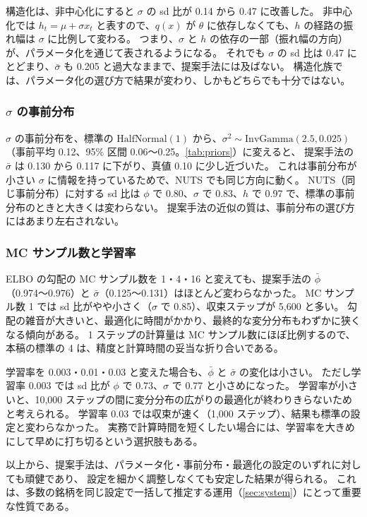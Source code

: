 構造化は、非中心化にすると $\sigma$ の sd 比が 0.14 から 0.47 に改善した。
非中心化では $h_t = \mu + \sigma x_t$ と表すので、$q(x)$ が $\theta$ に依存しなくても、$h$ の経路の振れ幅は $\sigma$ に比例して変わる。
つまり、$\sigma$ と $h$ の依存の一部（振れ幅の方向）が、パラメータ化を通じて表されるようになる。
それでも $\sigma$ の sd 比は 0.47 にとどまり、$\bar\sigma$ も 0.205 と過大なままで、提案手法には及ばない。
構造化族では、パラメータ化の選び方で結果が変わり、しかもどちらでも十分ではない。

\subsubsection{$\sigma$ の事前分布}

$\sigma$ の事前分布を、標準の $\mathrm{HalfNormal}(1)$ から、$\sigma^2 \sim \mathrm{InvGamma}(2.5, 0.025)$（事前平均 0.12、95\% 区間 0.06〜0.25。\cref{tab:priors}）に変えると、
提案手法の $\bar\sigma$ は 0.130 から 0.117 に下がり、真値 0.10 に少し近づいた。
これは事前分布が小さい $\sigma$ に情報を持っているためで、NUTS でも同じ方向に動く。
NUTS（同じ事前分布）に対する sd 比は $\phi$ で 0.80、$\sigma$ で 0.83、$h$ で 0.97 で、標準の事前分布のときと大きくは変わらない。
提案手法の近似の質は、事前分布の選び方にはあまり左右されない。

\subsubsection{MC サンプル数と学習率}

ELBO の勾配の MC サンプル数を 1・4・16 と変えても、提案手法の $\bar\phi$（0.974〜0.976）と $\bar\sigma$（0.125〜0.131）はほとんど変わらなかった。
MC サンプル数 1 では sd 比がやや小さく（$\sigma$ で 0.85）、収束ステップが 5,600 と多い。
勾配の雑音が大きいと、最適化に時間がかかり、最終的な変分分布もわずかに狭くなる傾向がある。
1 ステップの計算量は MC サンプル数にほぼ比例するので、本稿の標準の 4 は、精度と計算時間の妥当な折り合いである。

学習率を 0.003・0.01・0.03 と変えた場合も、$\bar\phi$ と $\bar\sigma$ の変化は小さい。
ただし学習率 0.003 では sd 比が $\phi$ で 0.73、$\sigma$ で 0.77 と小さめになった。
学習率が小さいと、10,000 ステップの間に変分分布の広がりの最適化が終わりきらないためと考えられる。
学習率 0.03 では収束が速く（1,000 ステップ）、結果も標準の設定と変わらなかった。
実務で計算時間を短くしたい場合には、学習率を大きめにして早めに打ち切るという選択肢もある。

以上から、提案手法は、パラメータ化・事前分布・最適化の設定のいずれに対しても頑健であり、
設定を細かく調整しなくても安定した結果が得られる。
これは、多数の銘柄を同じ設定で一括して推定する運用（\cref{sec:system}）にとって重要な性質である。

